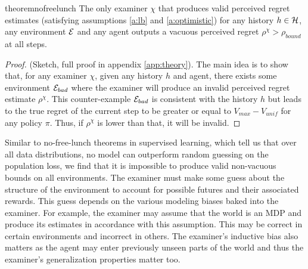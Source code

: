 \begin{highlightbox}
\begin{restatable}{theorem}{nofreelunch}
The only examiner $\chi$ that produces valid perceived regret estimates (satisfying assumptions \ref{a:lb} and \ref{a:optimistic}) for any history $h \in \mathcal{H}$, any environment $\mathcal{E}$ and any agent outputs a vacuous perceived regret $\rho^\chi > \rho_{bound}$  at all steps.
\end{restatable}
\end{highlightbox}
\vspace{-4mm}
\begin{proof}
    (Sketch, full proof in appendix \ref{app:theory}). The main idea is to show that, for any examiner $\chi$, given any history $h$ and agent, there exists some environment $\mathcal{E}_{bad}$ where the  examiner will produce an invalid perceived regret estimate $\rho^\chi$. 
    This counter-example $\mathcal{E}_{bad}$ is consistent with the history $h$ but leads to the true regret of the current step to be greater or equal to $V_{max} - V_{unif}$ for any policy $\pi$. 
    Thus, if $\rho^\chi$ is lower than that, it will be invalid.
\end{proof}
\vspace{-1mm}




Similar to no-free-lunch theorems in supervised learning, which tell us that over all data distributions, no model can outperform random guessing on the population loss, we find that it is impossible to produce valid non-vacuous bounds on all environments.  
The examiner must make some guess about the structure of the environment to account for possible futures and their associated rewards.  
This guess depends on the various modeling biases baked into the examiner. 
For example, the examiner may assume that the world is an MDP and produce its estimates in accordance with this assumption. This may be correct in certain environments and incorrect in others. 
The examiner's inductive bias also matters as the agent may enter previously unseen parts of the world and thus the examiner's generalization properties matter too.

